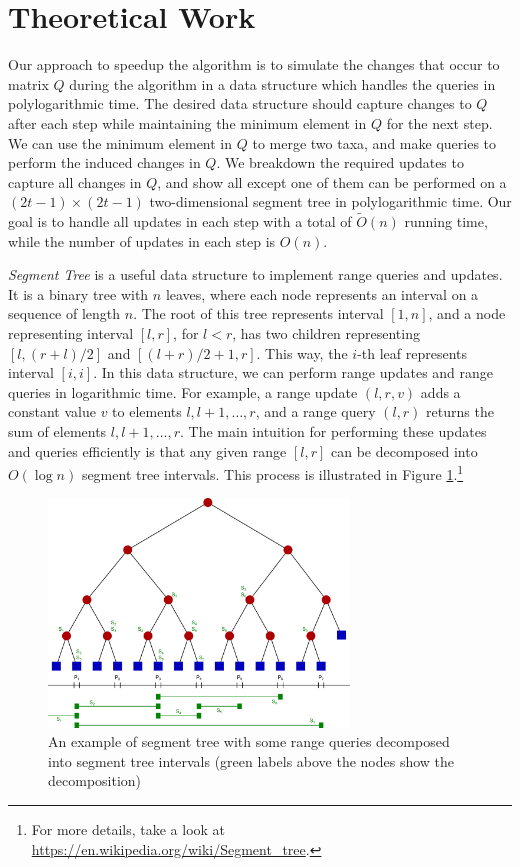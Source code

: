 \section{Theoretical Work}

Our approach to speedup the algorithm is to simulate the changes that occur to matrix $Q$ during the algorithm in a data structure which handles the queries in polylogarithmic time. The desired data structure should capture changes to $Q$ after each step while maintaining the minimum element in $Q$ for the next step. We can use the minimum element in $Q$ to merge two taxa, and make queries to perform the induced changes in $Q$. We breakdown the required updates to capture all changes in $Q$, and show all except one of them can be performed on a $(2t-1) \times (2t-1)$ two-dimensional segment tree in polylogarithmic time. Our goal is to handle all updates in each step with a total of $\widetilde{O}(n)$ running time, while the number of updates in each step is $O(n)$.

\emph{Segment Tree} is a useful data structure to implement range queries and updates. It is a binary tree with $n$ leaves, where each node represents an interval on a sequence of length $n$. The root of this tree represents interval $[1, n]$, and a node representing interval $[l, r]$, for $l < r$, has two children representing $[l, (r + l) / 2]$ and $[(l + r) / 2 + 1, r]$. This way, the $i$-th leaf represents interval $[i, i]$. In this data structure, we can perform range updates and range queries in logarithmic time. For example, a range update $(l, r, v)$ adds a constant value $v$ to elements $l, l+1, \ldots, r$, and a range query $(l, r)$ returns the sum of elements $l, l+1, \ldots, r$. The main intuition for performing these updates and queries efficiently is that any given range $[l, r]$ can be decomposed into $O(\log{n})$ segment tree intervals. This process is illustrated in Figure \ref{segment-tree}.\footnote{For more details, take a look at \href{https://en.wikipedia.org/wiki/Segment_tree}{https://en.wikipedia.org/wiki/Segment\_tree}.}

\begin{figure}[h!]\label{segment-tree}
	\caption{An example of segment tree with some range queries decomposed into segment tree intervals (green labels above the nodes show the decomposition)}
	\begin{center}
		\includegraphics[width=8cm]{Segment_tree.png}
	\end{center}
\end{figure}

